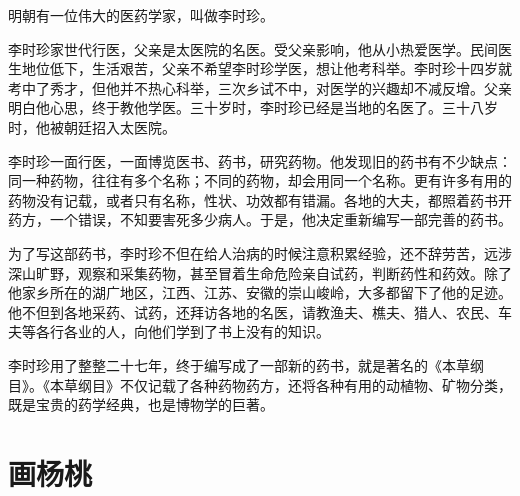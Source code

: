 \documentclass[12pt,UTF-8,openany]{ctexbook}
\begin{document}
\begin{large}
    
    明朝有一位伟大的医药学家，叫做李时珍。
    
    李时珍家世代行医，父亲是太医院的名医。受父亲影响，他从小热爱医学。民间医生地位低下，生活艰苦，父亲不希望李时珍学医，想让他考科举。李时珍十四岁就考中了秀才，但他并不热心科举，三次乡试不中，对医学的兴趣却不减反增。父亲明白他心思，终于教他学医。三十岁时，李时珍已经是当地的名医了。三十八岁时，他被朝廷招入太医院。
    
    李时珍一面行医，一面博览医书、药书，研究药物。他发现旧的药书有不少缺点：同一种药物，往往有多个名称；不同的药物，却会用同一个名称。更有许多有用的药物没有记载，或者只有名称，性状、功效都有错漏。各地的大夫，都照着药书开药方，一个错误，不知要害死多少病人。于是，他决定重新编写一部完善的药书。
    
    为了写这部药书，李时珍不但在给人治病的时候注意积累经验，还不辞劳苦，远涉深山旷野，观察和采集药物，甚至冒着生命危险亲自试药，判断药性和药效。除了他家乡所在的湖广地区，江西、江苏、安徽的崇山峻岭，大多都留下了他的足迹。他不但到各地采药、试药，还拜访各地的名医，请教渔夫、樵夫、猎人、农民、车夫等各行各业的人，向他们学到了书上没有的知识。
    
    李时珍用了整整二十七年，终于编写成了一部新的药书，就是著名的《本草纲目》。《本草纲目》不仅记载了各种药物药方，还将各种有用的动植物、矿物分类，既是宝贵的药学经典，也是博物学的巨著。
    
\end{large}



\chapter{画杨桃}
\end{document}
